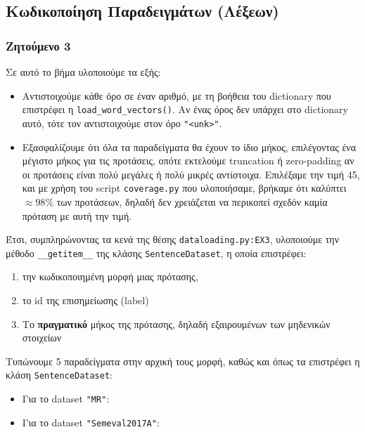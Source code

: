 \documentclass[a4paper, 12pt]{article}
\begin{document}
    \subsection{Κωδικοποίηση Παραδειγμάτων (Λέξεων)}

        \subsubsection*{Ζητούμενο 3}
            Σε αυτό το βήμα υλοποιούμε τα εξής:
            
            \begin{itemize}
                \item Αντιστοιχούμε κάθε όρο σε έναν αριθμό, με τη βοήθεια του dictionary που επιστρέφει η \verb|load_word_vectors()|. Αν ένας όρος δεν υπάρχει στο dictionary αυτό, τότε τον αντιστοιχούμε στον όρο \verb|"<unk>"|.
                \item Εξασφαλίζουμε ότι όλα τα παραδείγματα θα έχουν το ίδιο μήκος, επιλέγοντας ένα μέγιστο μήκος για τις προτάσεις, οπότε εκτελούμε truncation ή zero-padding αν οι προτάσεις είναι πολύ μεγάλες ή πολύ μικρές αντίστοιχα. Επιλέξαμε την τιμή 45, και με χρήση του script \verb|coverage.py| που υλοποιήσαμε, βρήκαμε ότι καλύπτει $\approx98\%$ των προτάσεων, δηλαδή δεν χρειάζεται να περικοπεί σχεδόν καμία πρόταση με αυτή την τιμή. 
            \end{itemize}
            
            Έτσι, συμπληρώνοντας τα κενά της θέσης \verb|dataloading.py:EX3|, υλοποιούμε την μέθοδο \verb|__getitem__| της κλάσης \verb|SentenceDataset|, η οποία επιστρέφει:
            
            \begin{enumerate}
                \item την κωδικοποιημένη μορφή μιας πρότασης,
                \item το id της επισημείωσης (label)
                \item Το \textbf{πραγματικό} μήκος της πρότασης, δηλαδή εξαιρουμένων των μηδενικών στοιχείων
            \end{enumerate}
            
            Τυπώνουμε 5 παραδείγματα στην αρχική τους μορφή, καθώς και όπως τα επιστρέφει η κλάση \verb|SentenceDataset|:
            
            \begin{itemize}
                \item Για το dataset \verb|"MR"|:
                    
                
                \item Για το dataset \verb|"Semeval2017A"|:
                    
            \end{itemize}
            
\end{document}
